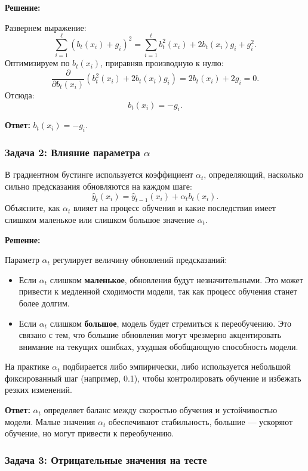 \textbf{Решение:}

Развернем выражение:
\[
    \sum_{i=1}^\ell (b_t(x_i) + g_i)^2 = \sum_{i=1}^\ell b_t^2(x_i) + 2b_t(x_i)g_i + g_i^2.
\]
Оптимизируем по $b_t(x_i)$, приравняв производную к нулю:
\[
    \frac{\partial}{\partial b_t(x_i)} \left(b_t^2(x_i) + 2b_t(x_i)g_i \right) = 2b_t(x_i) + 2g_i = 0.
\]
Отсюда:
\[
    b_t(x_i) = -g_i.
\]

\textbf{Ответ:} $b_t(x_i) = -g_i$.

\subsubsection{Задача 2: Влияние параметра $\alpha$}

В градиентном бустинге используется коэффициент $\alpha_t$, определяющий, насколько сильно предсказания обновляются на каждом шаге:
\[
    \hat{y}_t(x_i) = \hat{y}_{t-1}(x_i) + \alpha_t b_t(x_i).
\]
Объясните, как $\alpha_t$ влияет на процесс обучения и какие последствия имеет слишком маленькое или слишком большое значение $\alpha_t$.

\textbf{Решение:}

Параметр $\alpha_t$ регулирует величину обновлений предсказаний:
\begin{itemize}
    \item Если $\alpha_t$ слишком \textbf{маленькое}, обновления будут незначительными. Это может привести к медленной сходимости модели, так как процесс обучения станет более долгим.
    \item Если $\alpha_t$ слишком \textbf{большое}, модель будет стремиться к переобучению. Это связано с тем, что большие обновления могут чрезмерно акцентировать внимание на текущих ошибках, ухудшая обобщающую способность модели.
\end{itemize}

На практике $\alpha_t$ подбирается либо эмпирически, либо используется небольшой фиксированный шаг (например, 0.1), чтобы контролировать обучение и избежать резких изменений.

\textbf{Ответ:} $\alpha_t$ определяет баланс между скоростью обучения и устойчивостью модели. Малые значения $\alpha_t$ обеспечивают стабильность, большие — ускоряют обучение, но могут привести к переобучению.

\subsubsection{Задача 3: Отрицательные значения на тесте}

